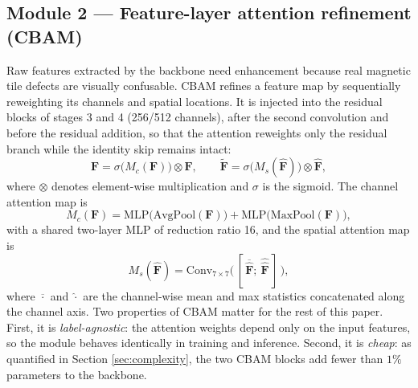 \documentclass[a4paper,fleqn]{cas-sc}
\begin{document}
\begin{sloppypar}
	\subsection{Module 2 --- Feature-layer attention refinement (CBAM)}
	\label{sec:cbam}
	\par{
		Raw features extracted by the backbone need enhancement because real magnetic tile defects are visually confusable. CBAM \citep{woo2018cbam} refines a feature map by sequentially reweighting its channels and spatial locations. It is injected into the residual blocks of stages 3 and 4 (256/512 channels), after the second convolution and before the residual addition, so that the attention reweights only the residual branch while the identity skip remains intact:
		\begin{equation}
			\hat{\mathbf{F}}=\sigma\bigl(M_c(\mathbf{F})\bigr)\otimes\mathbf{F},\qquad
			\tilde{\mathbf{F}}=\sigma\bigl(M_s(\hat{\mathbf{F}})\bigr)\otimes\hat{\mathbf{F}},
		\end{equation}
		where $\otimes$ denotes element-wise multiplication and $\sigma$ is the sigmoid. The channel attention map is
		\begin{equation}
			M_c(\mathbf{F})=\mathrm{MLP}\bigl(\mathrm{AvgPool}(\mathbf{F})\bigr)+\mathrm{MLP}\bigl(\mathrm{MaxPool}(\mathbf{F})\bigr),
		\end{equation}
		with a shared two-layer MLP of reduction ratio 16, and the spatial attention map is
		\begin{equation}
			M_s(\hat{\mathbf{F}})=\mathrm{Conv}_{7\times7}\bigl(\,[\,\overline{\hat{\mathbf{F}}};\ \widehat{\hat{\mathbf{F}}}\,]\,\bigr),
		\end{equation}
		where $\overline{\cdot}$ and $\widehat{\cdot}$ are the channel-wise mean and max statistics concatenated along the channel axis. Two properties of CBAM matter for the rest of this paper. First, it is \emph{label-agnostic}: the attention weights depend only on the input features, so the module behaves identically in training and inference. Second, it is \emph{cheap}: as quantified in Section \ref{sec:complexity}, the two CBAM blocks add fewer than $1\%$ parameters to the backbone.
	}


\end{sloppypar}
\end{document}
